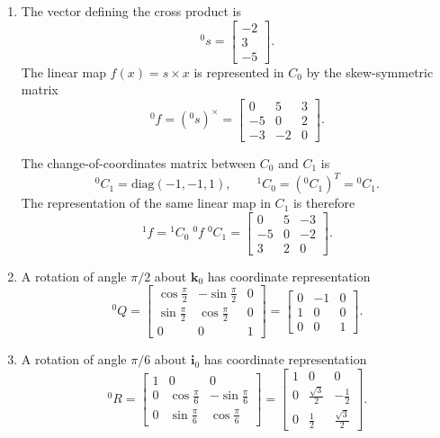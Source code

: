 \documentclass[11pt]{article}
\begin{document}
\begin{enumerate}[label=(\roman*)]

\item The vector defining the cross product is
\[
{}^{0}\!s = \begin{bmatrix} -2 \\ 3 \\ -5 \end{bmatrix}.
\]
The linear map $f(x)=s\times x$ is represented in $C_0$ by the skew-symmetric matrix
\[
{}^{0}\!f = ({}^{0}\!s)^\times
=
\begin{bmatrix}
0 & 5 & 3\\
-5 & 0 & 2\\
-3 & -2 & 0
\end{bmatrix}.
\]

The change-of-coordinates matrix between $C_0$ and $C_1$ is
\[
{}^{0}\!C_1 = \mathrm{diag}(-1,-1,1), \qquad {}^{1}\!C_0 = ({}^{0}\!C_1)^T = {}^{0}\!C_1.
\]
The representation of the same linear map in $C_1$ is therefore
\[
{}^{1}\!f = {}^{1}\!C_0\;{}^{0}\!f\;{}^{0}\!C_1
=
\begin{bmatrix}
0 & 5 & -3\\
-5 & 0 & -2\\
3 & 2 & 0
\end{bmatrix}.
\]

\item A rotation of angle $\pi/2$ about $\mathbf{k}_0$ has coordinate representation
\[
{}^{0}\!Q =
\begin{bmatrix}
\cos\frac{\pi}{2} & -\sin\frac{\pi}{2} & 0\\
\sin\frac{\pi}{2} & \cos\frac{\pi}{2} & 0\\
0 & 0 & 1
\end{bmatrix}
=
\begin{bmatrix}
0 & -1 & 0\\
1 & 0 & 0\\
0 & 0 & 1
\end{bmatrix}.
\]

\item A rotation of angle $\pi/6$ about $\mathbf{i}_0$ has coordinate representation
\[
{}^{0}\!R =
\begin{bmatrix}
1 & 0 & 0\\
0 & \cos\frac{\pi}{6} & -\sin\frac{\pi}{6}\\
0 & \sin\frac{\pi}{6} & \cos\frac{\pi}{6}
\end{bmatrix}
=
\begin{bmatrix}
1 & 0 & 0\\
0 & \frac{\sqrt{3}}{2} & -\frac{1}{2}\\
0 & \frac{1}{2} & \frac{\sqrt{3}}{2}
\end{bmatrix}.
\]


\end{enumerate}
\end{document}
